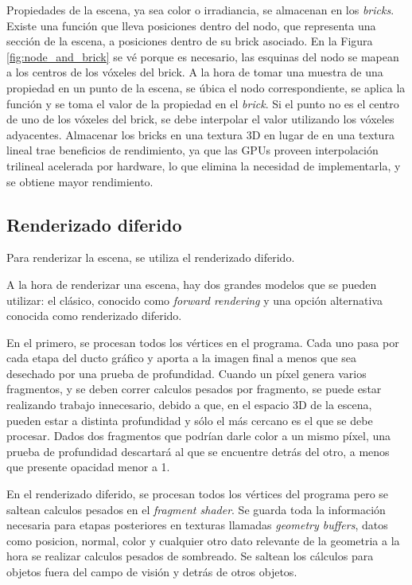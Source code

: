 Propiedades de la escena, ya sea color o irradiancia, se almacenan en los \textit{bricks}.
Existe una función que lleva posiciones dentro del nodo, que representa una sección de la escena, a posiciones dentro de su brick asociado.
En la Figura \ref{fig:node_and_brick} se vé porque es necesario, las esquinas del nodo se mapean a los centros de los vóxeles del brick.
A la hora de tomar una muestra de una propiedad en un punto de la escena, se úbica el nodo correspondiente, se aplica la función y se toma el valor de la propiedad en el \textit{brick}.
Si el punto no es el centro de uno de los vóxeles del brick, se debe interpolar el valor utilizando los vóxeles adyacentes.
Almacenar los bricks en una textura 3D en lugar de en una textura lineal trae beneficios de rendimiento, ya que las GPUs proveen interpolación trilineal acelerada por hardware, lo que elimina la necesidad de implementarla, y se obtiene mayor rendimiento.

\subsection{Renderizado diferido}\label{sec:deferred-rendering}

Para renderizar la escena, se utiliza el renderizado diferido.

A la hora de renderizar una escena, hay dos grandes modelos que se pueden utilizar: el clásico, conocido como \textit{forward rendering} y una opción alternativa conocida como renderizado diferido.

En el primero, se procesan todos los vértices en el programa.
Cada uno pasa por cada etapa del ducto gráfico y aporta a la imagen final a menos que sea desechado por una prueba de profundidad.
Cuando un píxel genera varios fragmentos, y se deben correr calculos pesados por fragmento, se puede estar realizando trabajo innecesario, debido a que, en el espacio 3D de la escena, pueden estar a distinta profundidad y sólo el más cercano es el que se debe procesar.
Dados dos fragmentos que podrían darle color a un mismo píxel, una prueba de profundidad descartará al que se encuentre detrás del otro, a menos que presente opacidad menor a 1.

En el renderizado diferido, se procesan todos los vértices del programa pero se saltean calculos pesados en el \textit{fragment shader}.
Se guarda toda la información necesaria para etapas posteriores en texturas llamadas \textit{geometry buffers}, datos como posicion, normal, color y cualquier otro dato relevante de la geometria a la hora se realizar calculos pesados de sombreado.
Se saltean los cálculos para objetos fuera del campo de visión y detrás de otros objetos.

